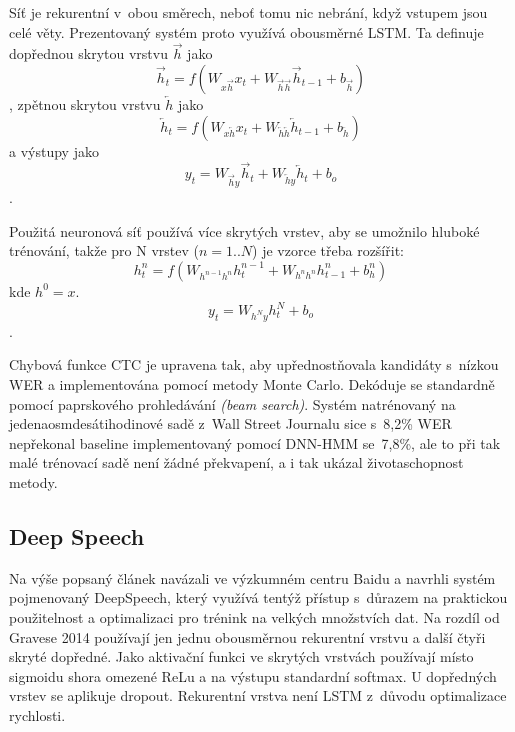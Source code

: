 Síť je rekurentní v~obou směrech, neboť tomu nic nebrání, když vstupem jsou celé
věty. Prezentovaný systém proto využívá obousměrné LSTM. Ta definuje dopřednou
skrytou vrstvu $\overrightarrow{h}$ jako
\begin{equation}
\overrightarrow{h}_t = f(W_{x\overrightarrow{h}}x_t + W_{\overrightarrow{h}\overrightarrow{h}}\overrightarrow{h}_{t-1} + b_{\overrightarrow{h}})
\end{equation}
, zpětnou skrytou vrstvu $\overleftarrow{h}$ jako
\begin{equation}
\overleftarrow{h}_t = f(W_{x\overleftarrow{h}}x_t + W_{\overleftarrow{h}\overleftarrow{h}}\overleftarrow{h}_{t-1} + b_{\overleftarrow{h}})
\end{equation}
a výstupy jako
\begin{equation}
y_t = W_{\overrightarrow{h}y}\overrightarrow{h}_t + W_{\overleftarrow{h}y}\overleftarrow{h}_t + b_o
\end{equation}.

Použitá neuronová síť používá více skrytých vrstev, aby se umožnilo hluboké
trénování, takže pro N vrstev ($n = 1 .. N$) je vzorce třeba rozšířit:
\begin{equation}
h_t^n = f(W_{h^{n-1}h^n}h_t^{n-1} + W_{h^{n}h^{n}}h_{t-1}^n + b_h^n)
\end{equation}
kde $h^0 = x$.
\begin{equation}
y_t = W_{h^{N}y}h_t^N + b_o
\end{equation}.

Chybová funkce CTC je upravena tak, aby upřednostňovala kandidáty s~nízkou WER a
implementována pomocí metody Monte Carlo. Dekóduje se standardně pomocí
paprskového prohledávání \textit{(beam search)}. Systém natrénovaný na
jedenaosmdesátihodinové sadě z~Wall Street Journalu sice s~8,2\% WER nepřekonal
baseline implementovaný pomocí DNN-HMM se~7,8\%, ale to při tak malé trénovací
sadě není žádné překvapení, a i tak ukázal životaschopnost metody.

\subsection{Deep Speech}

Na výše popsaný článek navázali ve výzkumném centru Baidu a navrhli systém
pojmenovaný DeepSpeech\cite{hannun2014deep}, který využívá tentýž přístup
s~důrazem na praktickou použitelnost a optimalizaci pro trénink na velkých
množstvích dat. Na rozdíl od Gravese 2014 používají jen jednu obousměrnou
rekurentní vrstvu a další čtyři skryté dopředné. Jako aktivační funkci ve
skrytých vrstvách používají místo sigmoidu shora omezené ReLu a na výstupu
standardní softmax. U dopředných vrstev se aplikuje dropout. Rekurentní vrstva
není LSTM z~důvodu optimalizace rychlosti.

